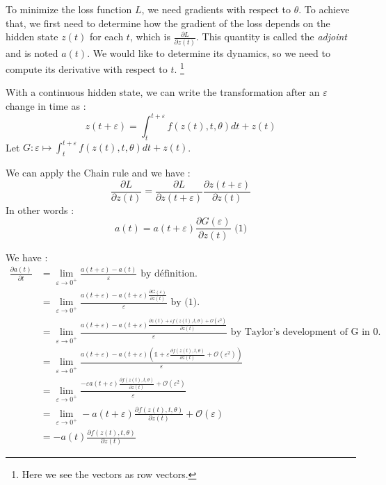 \documentclass[10pt,a4paper]{article}
\theoremstyle{definition}
\theoremstyle{definition}
\begin{document}
To minimize the loss function $L$, we need gradients with respect to $\theta$. To achieve that, we first need to determine how the gradient of the loss depends on the hidden state $z(t)$ for each $t$, which is $\frac{\partial L}{\partial z(t)}$. This quantity is called the \textit{adjoint} and is noted $a(t)$. We would like to determine its dynamics, so we need to compute its derivative with respect to $t$. \footnote{Here we see the vectors as row vectors.}

With a continuous hidden state, we can write the transformation after an $\varepsilon$ change in time as :
$$
z(t+\varepsilon) = \int^{t+\varepsilon}_{t} f(z(t),t,\theta) dt + z(t)
$$
Let $ G : \varepsilon \mapsto \int^{t+\varepsilon}_{t} f(z(t),t,\theta) dt + z(t)$.

We can apply the Chain rule and we have :
$$
\frac{\partial L}{\partial z(t)} = \frac{\partial L}{\partial z(t+\varepsilon)} \frac{\partial z(t+\varepsilon)}{\partial z(t)}
$$
In other words :
$$
a(t) = a(t+\varepsilon)\frac{\partial G(\varepsilon)}{\partial z(t)} \text{   (1)}
$$

We have :
\begin{align*}
\frac{\partial a(t)}{\partial t} &= \lim_{\varepsilon \rightarrow 0^+} \frac{a(t+\varepsilon) - a(t)}{\varepsilon} \text{ by définition.}\\
&= \lim_{\varepsilon \rightarrow 0^+} \frac{a(t+\varepsilon) - a(t+\varepsilon)\frac{\partial G(\varepsilon)}{\partial z(t)}}{\varepsilon} \text{ by (1).}\\
&= \lim_{\varepsilon \rightarrow 0^+} \frac{a(t+\varepsilon) - a(t+\varepsilon)\frac{\partial z(t) + \varepsilon f(z(t),t,\theta) + \mathcal{O}(\varepsilon^2)}{\partial z(t)}}{\varepsilon} \text{ by Taylor's development of G in 0.} \\
&= \lim_{\varepsilon \rightarrow 0^+} \frac{a(t+\varepsilon) - a(t+\varepsilon)(\mathbb{1} + \varepsilon \frac{\partial f(z(t),t,\theta)} {\partial z(t)}+ \mathcal{O}(\varepsilon^2))}{\varepsilon}\\
&= \lim_{\varepsilon \rightarrow 0^+} \frac{-\varepsilon a(t+\varepsilon) \frac{\partial f(z(t),t,\theta)} {\partial z(t)}+ \mathcal{O}(\varepsilon^2)}{\varepsilon}\\
&= \lim_{\varepsilon \rightarrow 0^+} - a(t+\varepsilon) \frac{\partial f(z(t),t,\theta)} {\partial z(t)}+ \mathcal{O}(\varepsilon)\\
&= -a(t)\frac{\partial f(z(t),t,\theta)} {\partial z(t)}
\end{align*}
 
\end{document}
